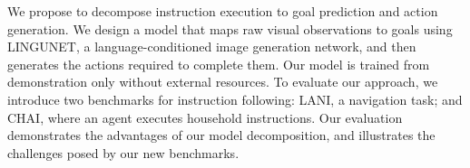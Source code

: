 We propose to decompose instruction execution to goal prediction and action generation. We  design a model that maps raw visual observations to goals using LINGUNET, a language-conditioned image generation network, and then generates the actions required to complete them. Our model is trained from demonstration only without external resources. To evaluate our approach, we introduce two benchmarks for instruction following: LANI, a navigation task;  and CHAI, where an agent executes household instructions. Our evaluation demonstrates the advantages of our model decomposition, and illustrates the challenges posed by our new benchmarks.
